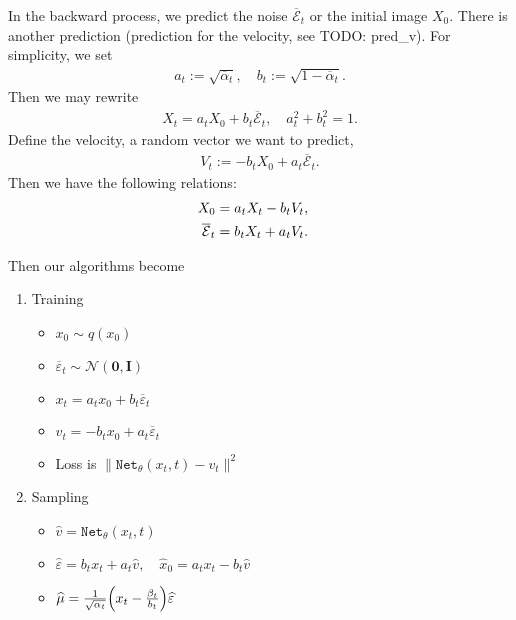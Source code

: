 \documentclass[
]{article}
\providecommand{\tightlist}{%
  \setlength{\itemsep}{0pt}\setlength{\parskip}{0pt}}\usepackage{longtable,booktabs,array}
\theoremstyle{remark}
\begin{document}
In the backward process, we predict the noise
\(\overline{\mathcal{E}}_t\) or the initial image \(X_0.\) There is
another prediction (prediction for the velocity, see TODO: pred\_v). For
simplicity, we set \[
\begin{aligned}
  a_t := \sqrt{\overline{\alpha}_t}, \quad b_t := \sqrt{1-\overline{\alpha}_t}.
\end{aligned}
\] Then we may rewrite \[
\begin{aligned}
  X_t = a_t X_0 + b_t \overline{\mathcal{E}}_t, \quad a_t^2+b_t^2 = 1.
\end{aligned}
\] Define the velocity, a random vector we want to predict, \[
\begin{aligned}
  V_t := -b_t X_0 + a_t \overline{\mathcal{E}}_t.
\end{aligned}
\] Then we have the following relations: \[
\begin{aligned}
  X_0 &= a_t X_t - b_t V_t , \cr  
  \overline{\mathcal{E}}_t &= b_t X_t + a_t V_t.
\end{aligned}
\]

Then our algorithms become

\begin{enumerate}
\def\labelenumi{\arabic{enumi}.}
\item
  Training

  \begin{itemize}
  \tightlist
  \item
    \(x_0\sim q(x_0)\)
  \item
    \(\overline{\varepsilon}_t \sim \mathcal{N}(\mathbf{0},\mathbf{I})\)
  \item
    \(x_t=a_t x_0 + b_t \overline{\varepsilon}_t\)
  \item
    \(v_t = -b_t x_0 + a_t \overline{\varepsilon}_t\)
  \item
    Loss is
    \(\bigl\lVert \texttt{Net}_{\theta} (x_t,t) - v_t \bigr\rVert^2\)
  \end{itemize}
\item
  Sampling

  \begin{itemize}
  \tightlist
  \item
    \(\widehat{v}=\texttt{Net}_{\theta}(x_t,t)\)
  \item
    \(\widehat{\varepsilon}=b_t x_t + a_t \widehat{v},\quad \widehat{x}_0=a_t x_t - b_t \widehat{v}\)
  \item
    \(\widehat{\mu}=\frac{1}{\sqrt{\alpha_t}}\Bigl( x_t- \frac{\beta_t}{b_t} \Bigr) \widehat{\varepsilon}\)
  \end{itemize}
\end{enumerate}
\end{document}
